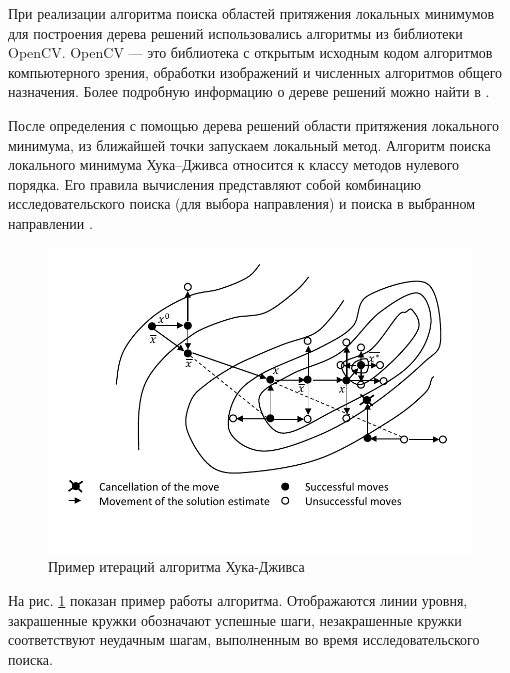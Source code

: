 \documentclass[runningheads]{llncs}
\begin{document}
При реализации алгоритма поиска областей притяжения локальных минимумов для построения дерева решений использовались алгоритмы из библиотеки OpenCV. OpenCV — это библиотека с открытым исходным кодом алгоритмов компьютерного зрения, обработки изображений и численных алгоритмов общего назначения. Более подробную информацию о дереве решений можно найти в \cite{Brahmbhatt2013}.




После определения с помощью дерева решений области притяжения локального минимума, из ближайшей точки запускаем локальный метод. Алгоритм поиска локального минимума Хука--Дживса относится к классу методов нулевого порядка. Его правила вычисления представляют собой комбинацию исследовательского поиска (для выбора направления) и поиска в выбранном направлении \cite{Himmelblau72}.

\begin{figure} 
	\begin{center} 
		\begin{minipage}[h]{0.8\linewidth} 
			\includegraphics[width=1\linewidth]{figure/fig1.pdf} 
			\caption{Пример итераций алгоритма Хука-Дживса} %
			\label{fig:fig1} 
		\end{minipage} 
	\end{center} 
\end{figure}	


На рис. \ref{fig:fig1} показан пример работы алгоритма. Отображаются линии  уровня, закрашенные кружки обозначают успешные шаги, незакрашенные кружки соответствуют неудачным шагам, выполненным во время исследовательского поиска. 
\end{document}

